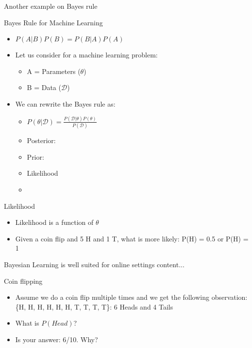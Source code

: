 \documentclass{beamer}
\begin{document}
\begin{frame}{Another example on Bayes rule}
\end{frame}


\begin{frame}{Bayes Rule for Machine Learning}
\begin{itemize}


    \item $P(A|B)P(B) = P(B|A)P(A)$
    \item Let us consider for a machine learning problem:
    \begin{itemize}
    	\item A = Parameters ($\theta$)
    	\item B = Data ($\mathcal{D}$)
    \end{itemize}
\item We can rewrite the Bayes rule as:
\begin{itemize}
	\item $P(\theta|\mathcal{D}) = \frac{P(\mathcal{D}|\theta)P(\theta)}{P(\mathcal{D})}$
	\item Posterior: 
	\item Prior:
	\item Likelihood
	\item 
\end{itemize}
\end{itemize}
\end{frame}

\begin{frame}{Likelihood}
\begin{itemize}
	\item Likelihood is a function of $\theta$
	\item Given a coin flip and 5 H and 1 T, what is more likely: P(H) = 0.5 or P(H) = 1
\end{itemize}
\end{frame}

\begin{frame}{Bayesian Learning is well suited for online settings}
content...
\end{frame}

\begin{frame}{Coin flipping}
\begin{itemize}
	\item Assume we do a coin flip multiple times and we get the following observation: \{H, H, H, H, H, H, T, T, T, T\}: 6 Heads and 4 Tails
	\item  What is $P(Head)$?
	\item Is your answer: 6/10. Why?
\end{itemize}

\end{frame}
\end{document}

